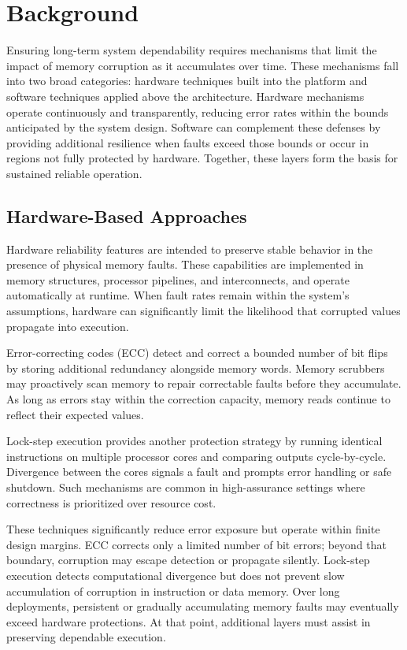 \section{Background}
\label{sec:background}

Ensuring long-term system dependability requires mechanisms that limit the impact of memory corruption as it accumulates over time. These mechanisms fall into two broad categories: hardware techniques built into the platform and software techniques applied above the architecture. Hardware mechanisms operate continuously and transparently, reducing error rates within the bounds anticipated by the system design. Software can complement these defenses by providing additional resilience when faults exceed those bounds or occur in regions not fully protected by hardware. Together, these layers form the basis for sustained reliable operation.

\subsection{Hardware-Based Approaches}

Hardware reliability features are intended to preserve stable behavior in the presence of physical memory faults. These capabilities are implemented in memory structures, processor pipelines, and interconnects, and operate automatically at runtime. When fault rates remain within the system's assumptions, hardware can significantly limit the likelihood that corrupted values propagate into execution.

Error-correcting codes (ECC) detect and correct a bounded number of bit flips by storing additional redundancy alongside memory words. Memory scrubbers may proactively scan memory to repair correctable faults before they accumulate. As long as errors stay within the correction capacity, memory reads continue to reflect their expected values.

Lock-step execution provides another protection strategy by running identical instructions on multiple processor cores and comparing outputs cycle-by-cycle. Divergence between the cores signals a fault and prompts error handling or safe shutdown. Such mechanisms are common in high-assurance settings where correctness is prioritized over resource cost.

These techniques significantly reduce error exposure but operate within finite design margins. ECC corrects only a limited number of bit errors; beyond that boundary, corruption may escape detection or propagate silently. Lock-step execution detects computational divergence but does not prevent slow accumulation of corruption in instruction or data memory. Over long deployments, persistent or gradually accumulating memory faults may eventually exceed hardware protections. At that point, additional layers must assist in preserving dependable execution.

